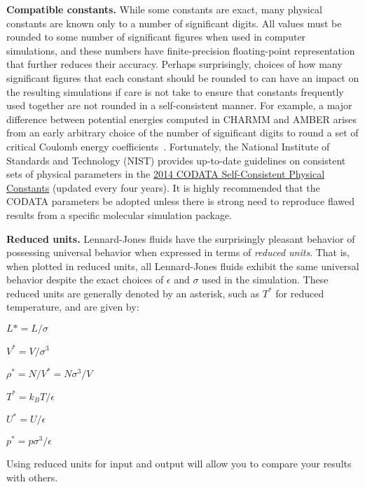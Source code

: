 \documentclass[aip,jcp,preprint,superscriptaddress,floatfix]{revtex4-1}
\begin{document}
\textbf{Compatible constants.}
While some constants are exact, many physical constants are known only to a number of significant digits.
All values must be rounded to some number of significant figures when used in computer simulations, and these numbers have finite-precision floating-point representation that further reduces their accuracy.
Perhaps surprisingly, choices of how many significant figures that each constant should be rounded to can have an impact on the resulting simulations if care is not take to ensure that constants frequently used together are not rounded in a self-consistent manner.
For example, a major difference between potential energies computed in CHARMM and AMBER arises from an early arbitrary choice of the number of significant digits to round a set of critical Coulomb energy coefficients~\cite{Shirts.JCAMD.31.147.2017}.
Fortunately, the National Institute of Standards and Technology (NIST) provides up-to-date guidelines on consistent sets of physical parameters in the \href{http://ws680.nist.gov/publication/get_pdf.cfm?pub_id=920686}{2014 CODATA Self-Consistent Physical Constants} (updated every four years).
It is highly recommended that the CODATA parameters be adopted unless there is strong need to reproduce flawed results from a specific molecular simulation package.

\textbf{Reduced units.}
Lennard-Jones fluids have the surprisingly pleasant behavior of possessing universal behavior when expressed in terms of \emph{reduced units}.
That is, when plotted in reduced units, all Lennard-Jones fluids exhibit the same universal behavior despite the exact choices of $\epsilon$ and $\sigma$ used in the simulation.
These reduced units are generally denoted by an asterisk, such as $T^*$ for reduced temperature, and are given by:
\begin{description}
\setlength{\itemsep}{0em} %
\item[length] $L* = L/\sigma$
\item[volume] $V^* = V / \sigma^3$
\item[density] $\rho^* = N / V^* = N \sigma^3 / V$
\item[temperature] $T^* = k_B T / \epsilon$
\item[energy] $U^* = U / \epsilon$
\item[pressure] $p^* = p \sigma^3 / \epsilon$
\end{description}
Using reduced units for input and output will allow you to compare your results with others.
\end{document}
